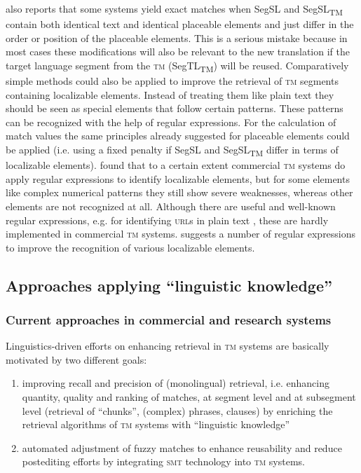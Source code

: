 \documentclass[output=paper]{LSP/langsci}
\begin{document}
\citet{Azzano2011} also reports that some systems yield exact matches when SegSL and SegSL\textsubscript{TM} contain both identical text and identical placeable elements and just differ in the order or position of the placeable elements. This is a serious mistake because in most cases these modifications will also be relevant to the new translation if the target language segment from the \textsc{tm} (SegTL\textsubscript{TM}) will be reused.
\newpage %
Comparatively simple methods could also be applied to improve the retrieval of \textsc{tm} segments containing localizable elements. Instead of treating them like plain text they should be seen as special elements that follow certain patterns. These patterns can be recognized with the help of regular expressions. For the calculation of match values the same principles already suggested for placeable elements could be applied (i.e. using a fixed penalty if SegSL and SegSL\textsubscript{TM} differ in terms of localizable elements). \citet{Azzano2011} found that to a certain extent commercial \textsc{tm} systems do apply regular expressions to identify localizable elements, but for some elements like complex numerical patterns they still show severe weaknesses, whereas other elements are not recognized at all. Although there are useful and well-known regular expressions, e.g. for identifying \textsc{url}s in plain text \citep{Goyvaerts2009}, these are hardly implemented in commercial \textsc{tm} systems. \citet{Azzano2011} suggests a number of regular expressions to improve the recognition of various localizable elements.

\subsection{Approaches applying ``linguistic knowledge''}\label{sec:reinke:3.2}

\subsubsection{Current approaches in commercial and research systems}\label{sec:reinke:3.2.1}
 
Linguistics-driven efforts on enhancing retrieval in \textsc{tm} systems are basically motivated by two different goals:
 
\begin{enumerate}
\item 
improving recall and precision of (monolingual) retrieval, i.e. enhancing quantity, quality and ranking of matches, at segment level and at subsegment level (retrieval of ``chunks'', (complex) phrases, clauses) by enriching the retrieval algorithms of \textsc{tm} systems with ``linguistic knowledge''
\item 
automated adjustment of fuzzy matches to enhance reusability and reduce postediting efforts by integrating \textsc{smt} technology into \textsc{tm} systems.
\end{enumerate} 
 
\end{document}
